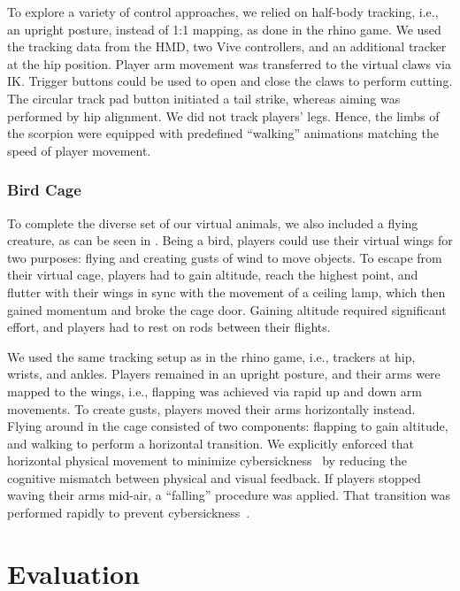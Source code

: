 \documentclass{sigchi}
\begin{document}
To explore a variety of control approaches, we relied on half-body tracking, i.e., an upright posture, instead of 1:1 mapping, as done in the rhino game. We used the tracking data from the HMD, two Vive controllers, and an additional tracker at the hip position. Player arm movement was transferred to the virtual claws via IK. Trigger buttons could be used to open and close the claws to perform cutting. The circular track pad button initiated a tail strike, whereas aiming was performed by hip alignment. We did not track players' legs. Hence, the limbs of the scorpion were equipped with predefined ``walking'' animations matching the speed of player movement.





\subsubsection{Bird Cage}
To complete the diverse set of our virtual animals, we also included a flying creature, as can be seen in . Being a bird, players could use their virtual wings for two purposes: flying and creating gusts of wind to move objects. To escape from their virtual cage, players had to gain altitude, reach the highest point, and flutter with their wings in sync with the movement of a ceiling lamp, which then gained momentum and broke the cage door. Gaining altitude required significant effort, and players had to rest on rods between their flights.

We used the same tracking setup as in the rhino game, i.e., trackers at hip, wrists, and ankles. Players remained in an upright posture, and their arms were mapped to the wings, i.e., flapping was achieved via rapid up and down arm movements. To create gusts, players moved their arms horizontally instead. Flying around in the cage consisted of two components: flapping to gain altitude, and walking to perform a horizontal transition. We explicitly enforced that horizontal physical movement to minimize cybersickness~\cite{laviola2000discussion} by reducing the cognitive mismatch between physical and visual feedback. If players stopped waving their arms mid-air, a ``falling'' procedure was applied. That transition was performed rapidly to prevent cybersickness~\cite{Krekhov:2018:GVRA}.






\section{Evaluation}
\end{document}

